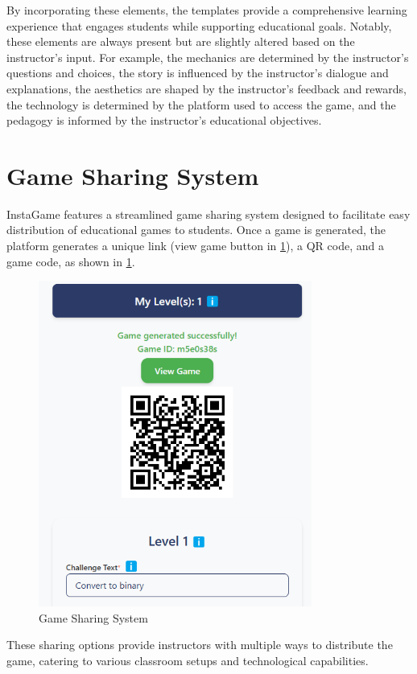 By incorporating these elements, the templates provide a comprehensive learning experience that engages students while supporting educational goals. Notably, these elements are always present but are slightly altered based on the instructor's input. For example, the mechanics are determined by the instructor's questions and choices, the story is influenced by the instructor's dialogue and explanations, the aesthetics are shaped by the instructor's feedback and rewards, the technology is determined by the platform used to access the game, and the pedagogy is informed by the instructor's educational objectives.


\section{Game Sharing System}

InstaGame features a streamlined game sharing system designed to facilitate easy distribution of educational games to students. Once a game is generated, the platform generates a unique link (view game button in \ref{fig:shareGame}), a QR code, and a game code, as shown in \ref{fig:shareGame}. 
\begin{figure}
	\centering
	\includegraphics[width=0.8\textwidth]{figures/Space_Invaders/Instructor_Portal_Space_Invader_Generated_Links.jpeg}
	\caption{Game Sharing System}
	\label{fig:shareGame}
\end{figure}
These sharing options provide instructors with multiple ways to distribute the game, catering to various classroom setups and technological capabilities.

